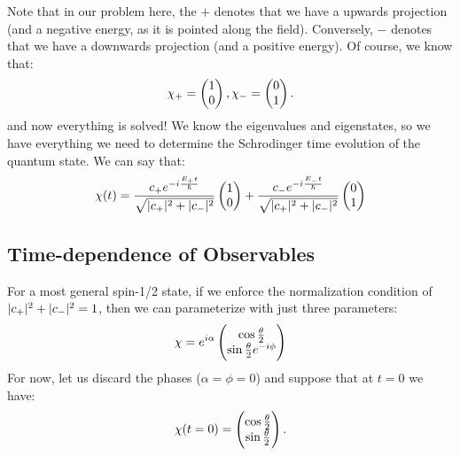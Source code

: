 Note that in our problem here, the $+$ denotes that we have a upwards projection (and a negative energy, as it is pointed along the field). Conversely, $-$ denotes that we have a downwards projection (and a positive energy). Of course, we know that:
\begin{equation}
    \chi_+ = \begin{pmatrix}1\\0\end{pmatrix}, \chi_- = \begin{pmatrix}0\\1\end{pmatrix}.
\end{equation}
and now everything is solved! We know the eigenvalues and eigenstates, so we have everything we need to determine the Schrodinger time evolution of the quantum state. We can say that:
\begin{equation}
    \chi(t) = \frac{c_+e^{-i\frac{E_+t}{\hbar}}}{\sqrt{\lvert c_+ \rvert^2 + \lvert c_- \rvert^2}}\begin{pmatrix}1\\0\end{pmatrix} + \frac{c_-e^{-i\frac{E_-t}{\hbar}}}{\sqrt{\lvert c_+ \rvert^2 + \lvert c_- \rvert^2}}\begin{pmatrix}0\\1\end{pmatrix}
\end{equation}

\subsection{Time-dependence of Observables}
For a most general spin-1/2 state, if we enforce the normalization condition of $\lvert c_+ \rvert^2 + \lvert c_- \rvert^2 = 1$, then we can parameterize with just three parameters:
\begin{equation}\label{eq-chigeneral}
    \chi = e^{i\alpha}\m{\cos\frac{\theta}{2} \\ \sin\frac{\theta}{2}e^{-i\phi}}
\end{equation}
For now, let us discard the phases ($\alpha = \phi = 0$) and suppose that at $t = 0$ we have:
\begin{equation}\label{eq-chithetat0}
    \chi(t = 0) = \begin{pmatrix}\cos\frac{\theta}{2} \\ \sin\frac{\theta}{2}\end{pmatrix}.
\end{equation}


